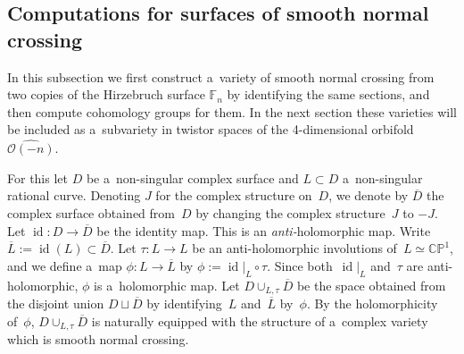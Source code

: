 \documentclass[pdftex]{sigma}
\numberwithin{equation}{section}
\DeclareMathOperator{\id}{id}
\begin{document}
\subsection{Computations for surfaces of smooth normal crossing}
\label{ss:sncs}

In this subsection we f\/irst construct a~variety of smooth normal crossing from two copies of the Hirzebruch surface
$\mathbb{F}_n$ by identifying the same sections, and then compute cohomology groups for them.
In the next section these varieties will be included as a~subvariety in twistor spaces of the 4-dimensional orbifold
$\widehat{\mathscr O(-n)}$.

For this let $D$ be a~non-singular complex surface and $L\subset D$ a~non-singular rational curve.
Denoting $J$ for the complex structure on~$D$, we denote by $\overline D$ the complex surface obtained from~$D$ by
changing the complex structure~$J$ to $-J$.
Let $\id :D\to \overline D$ be the identity map.
This is an {\em anti-}holomorphic map.
Write $\overline L:=\id(L)\subset \overline D$.
Let $\tau:L\to L$ be an anti-holomorphic involutions of~$L\simeq\mathbb{CP}^1$, and we def\/ine a~map
$\phi:L\to\overline L$ by $\phi:=\id|_{L}\circ\tau$.
Since both~$\id|_{L}$ and~$\tau$ are anti-holomorphic, $\phi$ is a~holomorphic map.
Let $D\cup_{L,\tau}\overline D$ be the space obtained from the disjoint union $D\sqcup \overline D$ by identifying~$L$
and~$\overline L$ by~$\phi$.
By the holomorphicity of~$\phi$, $D\cup_{L,\tau}\overline D$ is naturally equipped with the structure of a~complex
variety which is smooth normal crossing.
\end{document}
